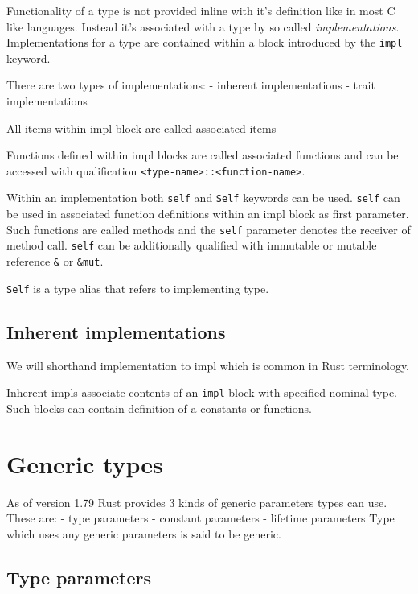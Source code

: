 Functionality of a type is not provided inline with it's definition like in most C like languages. 
Instead it's associated with a type by so called \textit{implementations}.
Implementations for a type are contained within a block introduced by the \texttt{impl} keyword.

There are two types of implementations:
- inherent implementations
- trait implementations

All items within impl block are called associated items

Functions defined within impl blocks are called associated functions and can be accessed with qualification \texttt{<type-name>::<function-name>}.

Within an implementation both \texttt{self} and \texttt{Self} keywords can be used.
\texttt{self} can be used in associated function definitions within an impl block as first parameter. 
Such functions are called methods and the \texttt{self} parameter denotes the receiver of method call. 
\texttt{self} can be additionally qualified with immutable or mutable reference \texttt{\&} or \texttt{\&mut}.

\texttt{Self} is a type alias that refers to implementing type.


\subsection{Inherent implementations}

We will shorthand implementation to impl which is common in Rust terminology.

Inherent impls associate contents of an \texttt{impl} block with specified nominal type.
Such blocks can contain definition of a constants or functions. 

\section{Generic types}

As of version 1.79 Rust provides 3 kinds of generic parameters types can use. 
These are:
- type parameters
- constant parameters
- lifetime parameters
Type which uses any generic parameters is said to be generic.

\subsection{Type parameters}

